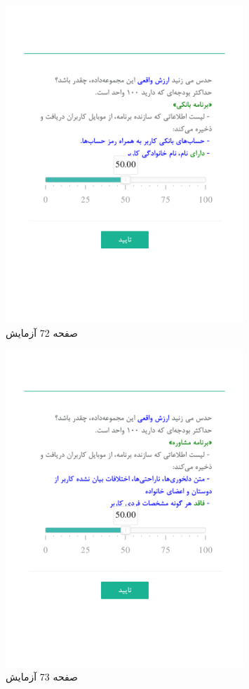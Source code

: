 { 
\begin{figure}[htpb]
\centering
\includegraphics[width=0.8\textwidth]{./img/Task72.png/}
\caption{ صفحه 72 آزمایش }
\label{fig:Task72}
\end{figure}
 
 
\begin{figure}[htpb]
\centering
\includegraphics[width=0.8\textwidth]{./img/Task73.png/}
\caption{ صفحه 73 آزمایش }
\label{fig:Task73}
\end{figure}
 
}
